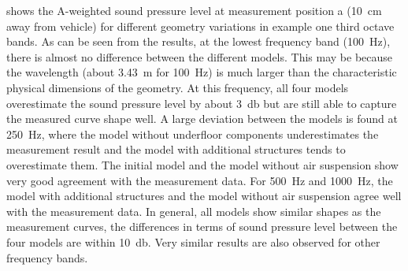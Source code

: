  shows the A-weighted sound pressure level at measurement position a (\SI{10}{\centi\meter} away from vehicle) for different geometry variations in example one third octave bands. As can be seen from the results, at the lowest frequency band (\SI{100}{\hertz}), there is almost no difference between the different models. This may be because the wavelength (about \SI{3.43}{\meter} for \SI{100}{\hertz}) is much larger than the characteristic physical dimensions of the geometry. At this frequency, all four models overestimate the sound pressure level by about \SI{3}{\decibel} but are still able to capture the measured curve shape well. A large deviation between the models is found at \SI{250}{\hertz}, where the model without underfloor components underestimates the measurement result and the model with additional structures tends to overestimate them. The initial model and the model without air suspension show very good agreement with the measurement data. For \SI{500}{\hertz} and \SI{1000}{\hertz}, the model with additional structures and the model without air suspension agree well with the measurement data. In general, all models show similar shapes as the measurement curves, the differences in terms of sound pressure level between the four models are within \SI{10}{\decibel}. Very similar results are also observed for other frequency bands.

